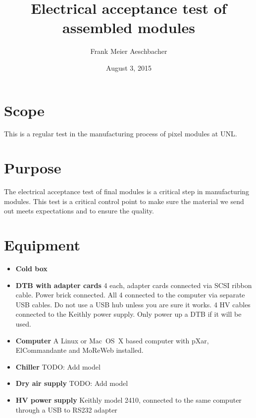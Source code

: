 \documentclass[12pt]{unlsilabsop}
\title{Electrical acceptance test of assembled modules}
\date{August 3, 2015}
\author{Frank Meier Aeschbacher}
\begin{document}
\maketitle

\section{Scope}
This is a regular test in the manufacturing process of pixel modules at UNL.

\section{Purpose}
The electrical acceptance test of final modules is a critical step in manufacturing modules. This test is a critical control point to make sure the material we send out meets expectations and to ensure the quality.



\section{Equipment}

\begin{itemize}
\item \textbf{Cold box} 
\item \textbf{DTB with adapter cards} 4 each, adapter cards connected via SCSI ribbon cable. Power brick connected. All 4 connected to the computer via separate USB cables. Do not use a USB hub unless you are sure it works. 4 HV cables connected to the Keithly power supply. Only power up a DTB if it will be used.
\item \textbf{Computer} A Linux or Mac~OS~X based computer with pXar, ElCommandante and MoReWeb installed.
\item \textbf{Chiller} TODO: Add model
\item \textbf{Dry air supply} TODO: Add model
\item \textbf{HV power supply} Keithly model 2410, connected to the same computer through a USB to RS232 adapter
\end{itemize}
\end{document}
